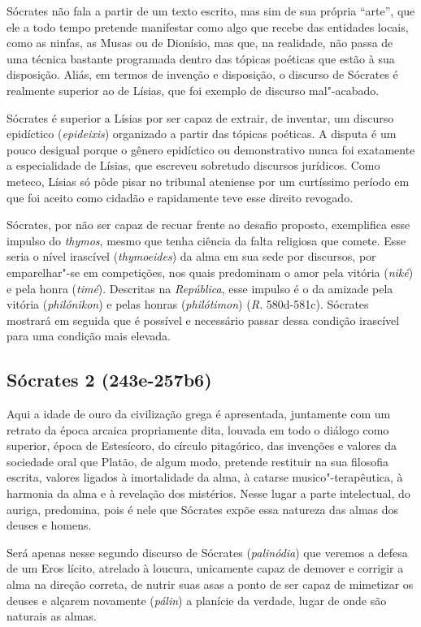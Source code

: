 Sócrates não fala a partir de um texto escrito, mas sim de sua própria
``arte'', que ele a todo tempo pretende manifestar como algo que recebe
das entidades locais, como as ninfas, as Musas ou de Dionísio, mas que,
na realidade, não passa de uma técnica bastante programada dentro das
tópicas poéticas que estão à sua disposição. Aliás, em termos de
invenção e disposição, o discurso de Sócrates é realmente superior ao de
Lísias, que foi exemplo de discurso mal"-acabado.

Sócrates é superior a Lísias por ser capaz de extrair, de inventar, um
discurso epidíctico (\emph{epideixis}) organizado a partir das tópicas
poéticas. A disputa é um pouco desigual porque o gênero epidíctico ou
demonstrativo nunca foi exatamente a especialidade de Lísias, que
escreveu sobretudo discursos jurídicos. Como meteco, Lísias só pôde
pisar no tribunal ateniense por um curtíssimo período em que foi aceito
como cidadão e rapidamente teve esse direito revogado.

Sócrates, por não ser capaz de recuar frente ao desafio proposto,
exemplifica esse impulso do \emph{thymos}, mesmo que tenha ciência da
falta religiosa que comete. Esse seria o nível irascível
(\emph{thymoeides}) da alma em sua sede por discursos, por emparelhar"-se
em competições, nos quais predominam o amor pela vitória (\emph{niké}) e
pela honra (\emph{timé}). Descritas na \emph{República}, esse impulso é
o da amizade pela vitória (\emph{philónikon}) e pelas honras
(\emph{philótimon}) (\emph{R.} 580d-581c). Sócrates mostrará em seguida
que é possível e necessário passar dessa condição irascível para uma
condição mais elevada.

\subsection{Sócrates 2 (243e-257b6)}

Aqui a idade de ouro da civilização
grega é apresentada, juntamente com um retrato da época arcaica
propriamente dita, louvada em todo o diálogo como superior, época de
Estesícoro, do círculo pitagórico, das invenções e valores da sociedade
oral que Platão, de algum modo, pretende restituir na sua filosofia
escrita, valores ligados à imortalidade da alma, à catarse
musico"-terapêutica, à harmonia da alma e à revelação dos mistérios.
Nesse lugar a parte intelectual, do auriga, predomina, pois é nele que
Sócrates expõe essa natureza das almas dos deuses e homens.

Será apenas nesse segundo discurso de Sócrates (\emph{palinódia}) que
veremos a defesa de um Eros lícito, atrelado à loucura, unicamente capaz
de demover e corrigir a alma na direção correta, de nutrir suas asas a
ponto de ser capaz de mimetizar os deuses e alçarem novamente
(\emph{pálin}) a planície da verdade, lugar de onde são naturais as
almas.

